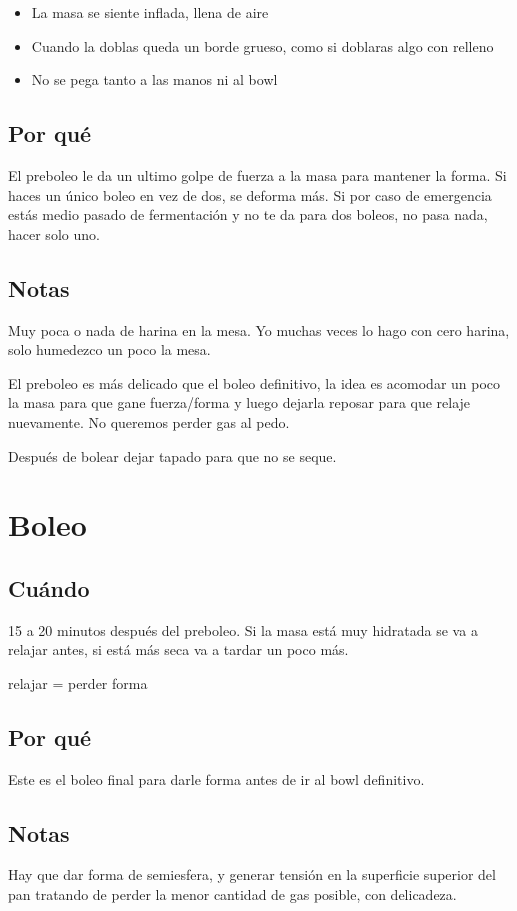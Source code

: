 \documentclass[10pt,a4paper]{article}
\begin{document}
\begin{itemize}
\item La masa se siente inflada, llena de aire
\item Cuando la doblas queda un borde grueso, como si doblaras algo con relleno
\item No se pega tanto a las manos ni al bowl
\end{itemize}
\subsection*{Por qué}
El preboleo le da un ultimo golpe de fuerza a la masa para mantener la forma. Si
haces un único boleo en vez de dos, se deforma más. Si por caso de emergencia
estás medio pasado de fermentación y no te da para dos boleos, no pasa nada,
hacer solo uno.

\subsection*{Notas}
Muy poca o nada de harina en la mesa. Yo muchas veces lo hago con cero harina,
solo humedezco un poco la mesa.

El preboleo es más delicado que el boleo definitivo, la idea es acomodar un poco
la masa para que gane fuerza/forma y luego dejarla reposar para que relaje
nuevamente. No queremos perder gas al pedo.

Después de bolear dejar tapado para que no se seque.

\section{Boleo}
\subsection*{Cuándo}
15 a 20 minutos después del preboleo. Si la masa está muy hidratada se va a
relajar antes, si está más seca va a tardar un poco más.

relajar = perder forma
\subsection*{Por qué}
Este es el boleo final para darle forma antes de ir al bowl definitivo.
\subsection*{Notas}
Hay que dar forma de semiesfera, y generar tensión en la superficie superior del pan tratando de perder la menor cantidad de gas posible, con delicadeza.
\end{document}
